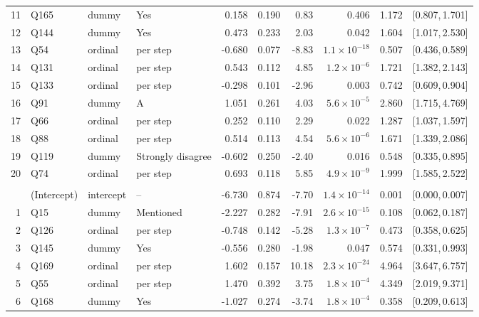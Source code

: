 \begin{landscape}
\begin{longtable}{r l l l r r r r r c}
\rowcolor{gray!12} 11 & Q165 & dummy & Yes & 0.158 & 0.190 & 0.83 & 0.406 & 1.172 & [0.807,\,1.701] &  \\
12 & Q144 & dummy & Yes & 0.473 & 0.233 & 2.03 & 0.042 & 1.604 & [1.017,\,2.530] &  \\
13 & Q54 & ordinal & per step & -0.680 & 0.077 & -8.83 & $1.1{\times}10^{-18}$ & 0.507 & [0.436,\,0.589] &  \\
14 & Q131 & ordinal & per step & 0.543 & 0.112 & 4.85 & $1.2{\times}10^{-6}$ & 1.721 & [1.382,\,2.143] &  \\
15 & Q133 & ordinal & per step & -0.298 & 0.101 & -2.96 & 0.003 & 0.742 & [0.609,\,0.904] &  \\
16 & Q91 & dummy & A & 1.051 & 0.261 & 4.03 & $5.6{\times}10^{-5}$ & 2.860 & [1.715,\,4.769] &  \\
17 & Q66 & ordinal & per step & 0.252 & 0.110 & 2.29 & 0.022 & 1.287 & [1.037,\,1.597] &  \\
18 & Q88 & ordinal & per step & 0.514 & 0.113 & 4.54 & $5.6{\times}10^{-6}$ & 1.671 & [1.339,\,2.086] &  \\
19 & Q119 & dummy & Strongly disagree & -0.602 & 0.250 & -2.40 & 0.016 & 0.548 & [0.335,\,0.895] &  \\
20 & Q74 & ordinal & per step & 0.693 & 0.118 & 5.85 & $4.9{\times}10^{-9}$ & 1.999 & [1.585,\,2.522] &  \\
\addlinespace[4pt]
\multicolumn{9}{l}{\textbf{Cluster 2} \quad \small $n = 2579$ ($n_{\text{in}} = 826$), AIC $= 891.7$, residual deviance $= 849.7$ on 2558 df}\\[2pt]
 & (Intercept) & intercept & -- & -6.730 & 0.874 & -7.70 & $1.4{\times}10^{-14}$ & 0.001 & [0.000,\,0.007] &  \\
1 & Q15 & dummy & Mentioned & -2.227 & 0.282 & -7.91 & $2.6{\times}10^{-15}$ & 0.108 & [0.062,\,0.187] &  \\
2 & Q126 & ordinal & per step & -0.748 & 0.142 & -5.28 & $1.3{\times}10^{-7}$ & 0.473 & [0.358,\,0.625] &  \\
3 & Q145 & dummy & Yes & -0.556 & 0.280 & -1.98 & 0.047 & 0.574 & [0.331,\,0.993] &  \\
4 & Q169 & ordinal & per step & 1.602 & 0.157 & 10.18 & $2.3{\times}10^{-24}$ & 4.964 & [3.647,\,6.757] &  \\
5 & Q55 & ordinal & per step & 1.470 & 0.392 & 3.75 & $1.8{\times}10^{-4}$ & 4.349 & [2.019,\,9.371] &  \\
6 & Q168 & dummy & Yes & -1.027 & 0.274 & -3.74 & $1.8{\times}10^{-4}$ & 0.358 & [0.209,\,0.613] &  \\

\end{longtable}
\end{landscape}
